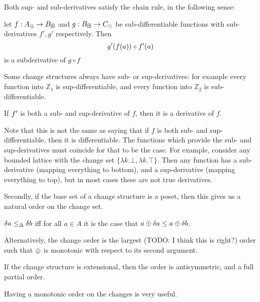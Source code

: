 Both sup- and sub-derivatives satisfy the chain rule, in the following sense: 
\begin{prop}
  let $f : A_\oplus \rightarrow B_\boxplus$ and $g : B_\boxplus \rightarrow C_\odot$ be
  sub-differentiable functions with sub-derivatives $f', g'$ respectively. Then
  $$g'(f(a)) \circ f'(a)$$ is a subderivative of $g \circ f$
\end{prop}

Some change structures always have sub- or sup-derivatives: for example every function
into $\mathbb{Z}_1$ is sup-differentiable, and every function into $\mathbb{Z}_2$ is 
sub-differentiable.

\begin{prop}
  If $f'$ is both a sub- and sup-derivative of $f$, then it is a derivative of $f$.
\end{prop}

Note that this is not the same as saying that if $f$ is both sub- and
sup-differentiable, then it is differentiable. The functions which provide the
sub- and sup-derivatives must coincide for that to be the case. For example,
consider any bounded lattice with the change set $\{ \lambda k . \bot, \lambda k
 . \top \}$. Then any function has a sub-derivative (mapping everything to
 bottom), and a sup-derivative (mapping everything to top), but in most cases
 these are not true derivatives.

Secondly, if the base set of a change structure is a poset, then this gives us a natural
order on the change set.

\begin{defn}
  $\delta a \leq_\Delta \delta b$ iff for all $a \in A$ it is the case that $a \oplus \delta a \leq a \oplus \delta b$.
\end{defn}

Alternatively, the change order is the largest (TODO: I think this is right?) order such that $\oplus$ is monotonic with
respect to its second argument.

If the change structure is extensional, then the order is antisymmetric, and a
full partial order.

Having a monotonic order on the changes is very useful.

